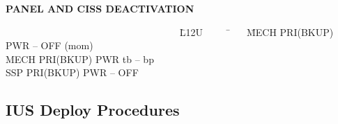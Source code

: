 \documentclass[Space_Shuttle_Vessel_Manual.tex]{subfiles}
\begin{document}
{\noindent
\hspace{100pt}\textbf{PANEL AND CISS DEACTIVATION}
\begin{tabbing}
~~~~~~~~~~~~~~~~~~~~~~~~~~~~~~~~~~~ \= L12U~~~~~ \= ~~ \= MECH PRI(BKUP) PWR -- OFF (mom)\\
\>\>\> MECH PRI(BKUP) PWR tb -- bp\\
\>\>\> SSP PRI(BKUP) PWR -- OFF\\
\end{tabbing}
}

\newpage
\subsection{IUS Deploy Procedures}
\end{document}
